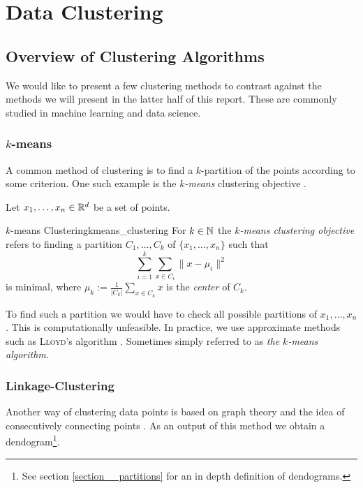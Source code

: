 \chapter{Data Clustering}
\label{chapter__dataclustering}

\section{Overview of Clustering Algorithms}
We would like to present a few clustering methods to contrast against the methods we will present in the latter half of this report. These are commonly studied in machine learning and data science.

\subsection{$k$-means}
A common method of clustering is to find a $k$-partition of the points according to some criterion.
One such example is the \emph{$k$-means} clustering objective \cite[Section~3.1]{Scitovski2021}.

Let $x_1, \dots, x_n \in \mathbb R^d$ be a set of points.

\begin{definition}{$k$-means Clustering}{kmeans_clustering}
For $k \in \mathbb N$ the \emph{$k$-means clustering objective} refers to finding a partition $C_1, \dots, C_k$ of $\{x_1, \dots, x_n\}$ such that
\begin{equation*}
\label{eq:kmean_optimization}
    \sum_{i = 1}^k \sum_{x \in C_i} \|x - \mu_i\|^2
\end{equation*}
is minimal, where $\mu_k := \frac{1}{|C_k|}\sum_{x \in C_k} x$ is the \emph{center} of $C_k$.
\end{definition}
To find such a partition we would have to check all possible partitions of $x_1, \dots, x_n$. This is computationally unfeasible. In practice, we use approximate methods such as \textsc{Lloyd}'s algorithm \cite[Section~3.1.2]{Scitovski2021}.
Sometimes simply referred to as \emph{the $k$-means algorithm}.

\subsection{Linkage-Clustering}
\label{section__linkage_clustering}
Another way of clustering data points is based on graph theory and the idea of consecutively connecting points \cite[Section~4.2.2]{Everitt2011}.
As an output of this method we obtain a
dendogram\footnote{See section \ref{section__partitions} for an in depth definition of dendograms.}.

